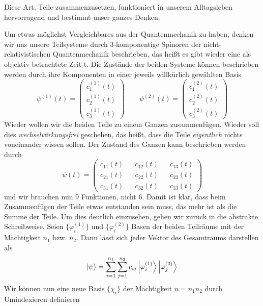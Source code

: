 \documentclass[12pt]{book}
\begin{document}
Diese Art, Teile zusammenzusetzen, funktioniert in unserem Alltagsleben hervorragend und bestimmt unser ganzes Denken.

Um etwas möglichst Vergleichbares aus der Quantenmechanik zu haben, denken wir uns unsere Teilsysteme durch 3-komponentige Spinoren der nicht-relativistischen Quantenmechanik beschrieben, das heißt es gibt wieder eine als objektiv betrachtete Zeit t. Die Zustände der beiden Systeme können beschrieben werden durch ihre Komponenten in einer jeweils willkürlich gewählten Basis
\begin{equation*}
\psi^{(1)}(t) = \begin{pmatrix} c^{(1)}_1(t) \\ c^{(1)}_2(t) \\ c^{(1)}_3(t) \end{pmatrix}
\quad\quad
\psi^{(2)}(t) = \begin{pmatrix} c^{(2)}_1(t) \\ c^{(2)}_2(t) \\ c^{(2)}_3(t) \end{pmatrix}
\end{equation*} 
Wieder wollen wir die beiden Teile zu einem Ganzen zusammenfügen. Wieder soll dies \emph{wechselwirkungsfrei} geschehen, das heißt, dass die Teile \emph{eigentlich} nichts voneinander wissen sollen. Der Zustand des Ganzen kann beschrieben werden durch 
\begin{equation}
\psi(t) = \begin{pmatrix} 
c_{11}(t) && c_{12}(t) && c_{13}(t) \\
c_{21}(t) && c_{22}(t) && c_{23}(t) \\
c_{31}(t) && c_{32}(t) && c_{33}(t) 
\end{pmatrix}
\label{eq:product_vector}
\end{equation} 
und wir brauchen nun 9 Funktionen, nicht 6. Damit ist klar, dass beim Zusammenfügen der Teile etwas entstanden sein muss, das mehr ist als die Summe der Teile. Um dies deutlich einzusehen, gehen wir zurück in die abstrakte Schreibweise. Seien $\{{\varphi^{(1)}_i}\}$ und $\{{\varphi^{(2)}_i}\}$ Basen der beiden Teilräume mit der Mächtigkeit $n_1$ bzw. $n_2$. Dann lässt sich jeder Vektor des Gesamtraums darstellen als
\begin{equation*}
\ket{\psi} = \sum_{i=1}^{n_1} \sum_{j=1}^{n_2} c_{ij} \ket{\varphi^{(1)}_i} \ket{\varphi^{(2)}_j}
\end{equation*} 
Wir können nun eine neue Basis $\{{\chi_i}\}$ der Mächtigkeit $n = n_1 n_2$ durch Umindexieren definieren 
\end{document}

